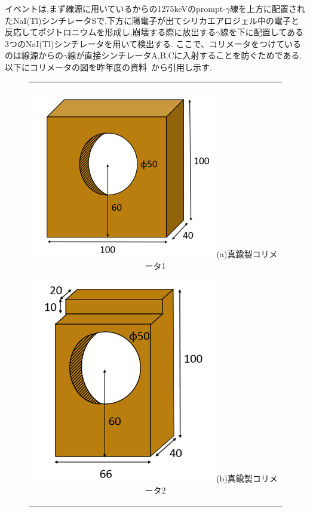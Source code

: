 イベントは,まず線源に用いているからの1275keVのprompt-$\gamma$線を上方に配置されたNaI(Tl)シンチレータSで,下方に陽電子が出てシリカエアロジェル中の電子と反応してポジトロニウムを形成し,崩壊する際に放出する$\gamma$線を下に配置してある3つのNaI(Tl)シンチレータを用いて検出する.
ここで、コリメータをつけているのは線源からの$\gamma$線が直接シンチレータA,B,Cに入射することを防ぐためである.
以下にコリメータの図を昨年度の資料~\cite{卒論発表2015}から引用し示す.
\begin{figure}[H]
	\centering
		\begin{tabular}{c}
			\begin{minipage}{0.5\hsize}
				\centering
					\includegraphics[width=80mm]{fig/isb/collimator1.png}
					\hspace{1.6cm} (a)真鍮製コリメータ1
			\end{minipage}
			\begin{minipage}{0.5\hsize}
				\centering
					\includegraphics[width=80mm]{fig/isb/collimator2.png}
					\hspace{1.6cm} (b)真鍮製コリメータ2
			\end{minipage}
		\end{tabular}
\end{figure}
